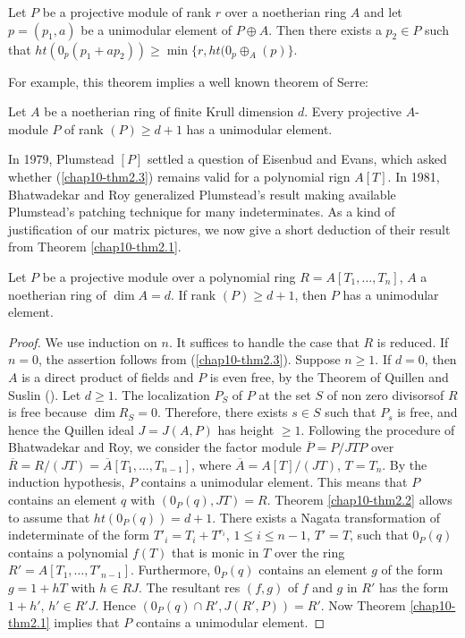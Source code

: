 \begin{subthm}\label{chap10-thm2.2}
Let $P$ be a projective module of rank $r$ over a\pageoriginale
noetherian ring $A$ and let $p=(p_{1},a)$ be a unimodular element of
$P\oplus A$. Then there exists a $p_{2}\in P$ such that
$ht(0_{p}(p_{1}+ap_{2}))\geq \min \{r,ht(0_{p}\oplus_{A}(p)\}$. 
\end{subthm}

For example, this theorem implies a well known theorem of Serre:


\begin{subthm}\label{chap10-thm2.3}
Let $A$ be a noetherian ring of finite Krull dimension $d$. Every
projective $A$-module $P$ of rank $(P)\geq d+1$ has a unimodular
element. 
\end{subthm}

In 1979, Plumstead $[P]$ settled a question of Eisenbud and
Evans, which asked whether (\ref{chap10-thm2.3}) remains valid for a
polynomial rign $A[T]$. In 1981, Bhatwadekar and Roy generalized
Plumstead's result making available Plumstead's patching technique for
many indeterminates. As a kind of justification of our matrix
pictures, we now give a short deduction of their result from
Theorem \ref{chap10-thm2.1}. 

\begin{subthm}\label{chap10-thm2.4}
Let $P$ be a projective module over a polynomial ring
$R=A[T_{1},\ldots,T_{n}]$, $A$ a noetherian ring of $\dim A=d$. If
rank $(P)\geq d+1$, then $P$ has a unimodular element. 
\end{subthm}

\begin{proof}
We use induction on $n$. It suffices to handle the case that $R$ is
reduced. If $n=0$, the assertion follows from
(\ref{chap10-thm2.3}). Suppose $n\geq 1$. If $d=0$, then $A$ is a
direct product of fields and $P$ is even free, by the Theorem of
Quillen and Suslin (\cite{chap10-Qu}). Let $d\geq 1$. The localization
$P_{S}$ of $P$ at the set $S$ of non zero divisors\pageoriginale of $R$ is free
because $\dim R_{S}=0$. Therefore, there exists $s\in S$ such that
$P_{s}$ is free, and hence the Quillen ideal $J=J(A,P)$ has height
$\geq 1$. Following the procedure of Bhatwadekar and Roy, we consider
the factor module $\overline{P}=P/JTP$ over
$\overline{R}=R/(JT)=\overline{A}[T_{1},\ldots,T_{n-1}]$, where
$\overline{A}=A[T]/(JT)$, $T=T_{n}$. By the induction hypothesis, $P$
contains a unimodular element. This means that $P$ contains an element
$q$ with $(0_{P}(q),JT)=R$. Theorem \ref{chap10-thm2.2} allows to
assume that $ht(0_{P}(q))=d+1$. There exists a Nagata transformation
of indeterminate of the form $T'_{i}=T_{i}+T^{r_{i}}$, $1\leq i\leq
n-1$, $T'=T$, such that $0_{P}(q)$ contains a polynomial $f(T)$ that
is monic in $T$ over the ring
$R'=A[T_{1},\ldots,T'_{n-1}]$. Furthermore, $0_{P}(q)$ contains an
element $g$ of the form $g=1+hT$ with $h\in RJ$. The resultant res
$(f,g)$ of $f$ and $g$ in $R'$ has the form $1+h'$, $h'\in R'J$. Hence
$(0_{P}(q)\cap R',J(R',P))=R'$. Now Theorem \ref{chap10-thm2.1}
implies that $P$ contains a unimodular element.
\end{proof}

